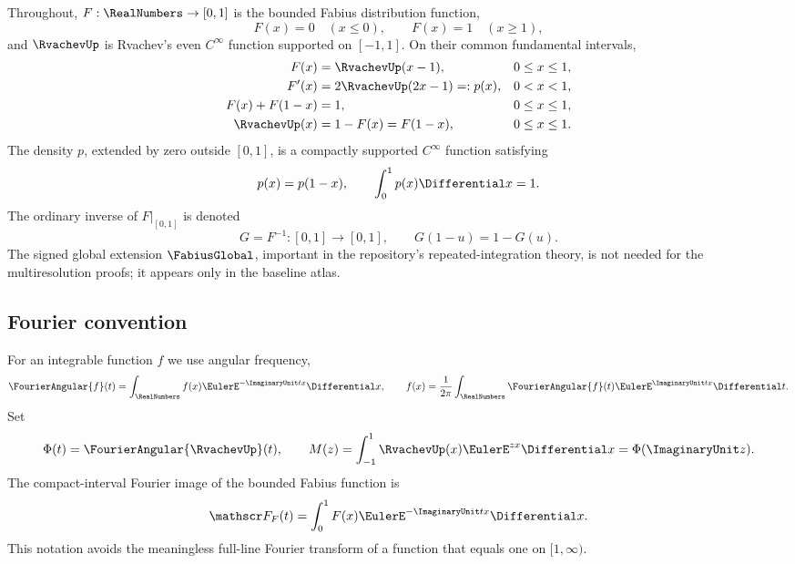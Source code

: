 \documentclass[11pt]{article}
\theoremstyle{definition}
\theoremstyle{remark}
\begin{document}
Throughout, $F:\RealNumbers\to[0,1]$ is the bounded Fabius distribution function,
\[
 F(x)=0\quad(x\le0),\qquad F(x)=1\quad(x\ge1),
\]
and $\RvachevUp$ is Rvachev's even $C^\infty$ function supported on $[-1,1]$.
On their common fundamental intervals,
\begin{align}
 F(x)&=\RvachevUp(x-1), &&0\le x\le1,\label{p3:eq:F-up-shift}\\
 F'(x)&=2\RvachevUp(2x-1)=:p(x), &&0<x<1,\label{p3:eq:p-def}\\
 F(x)+F(1-x)&=1, &&0\le x\le1,\label{p3:eq:F-symmetry}\\
 \RvachevUp(x)&=1-F(x)=F(1-x), &&0\le x\le1.\label{p3:eq:up-survival}
\end{align}
The density $p$, extended by zero outside $[0,1]$, is a compactly supported
$C^\infty$ function satisfying
\begin{equation}\label{p3:eq:p-symmetry}
 p(x)=p(1-x),\qquad \int_0^1p(x)\Differential x=1.
\end{equation}
The ordinary inverse of $F|_{[0,1]}$ is denoted
\begin{equation}\label{p3:eq:G-def}
 G=F^{-1}:[0,1]\longrightarrow[0,1],
 \qquad G(1-u)=1-G(u).
\end{equation}
The signed global extension $\FabiusGlobal$, important in the repository's
repeated-integration theory, is not needed for the multiresolution proofs; it
appears only in the baseline atlas.

\subsection{Fourier convention}

For an integrable function $f$ we use angular frequency,
\begin{equation}\label{p3:eq:Fourier-convention}
 \FourierAngular{f}(t)=\int_\RealNumbers f(x)\EulerE^{-\ImaginaryUnit tx}\Differential x,
 \qquad
 f(x)=\frac1{2\pi}\int_\RealNumbers\FourierAngular{f}(t)\EulerE^{\ImaginaryUnit tx}\Differential t.
\end{equation}
Set
\begin{equation}\label{p3:eq:Phi-M-def}
 \Phi(t)=\FourierAngular{\RvachevUp}(t),\qquad
 M(z)=\int_{-1}^1\RvachevUp(x)\EulerE^{zx}\Differential x=\Phi(\ImaginaryUnit z).
\end{equation}
The compact-interval Fourier image of the bounded Fabius function is
\begin{equation}\label{p3:eq:Fhat-def}
 \mathscr F_F(t)=\int_0^1F(x)\EulerE^{-\ImaginaryUnit tx}\Differential x.
\end{equation}
This notation avoids the meaningless full-line Fourier transform of a function
that equals one on $[1,\infty)$.
\end{document}
